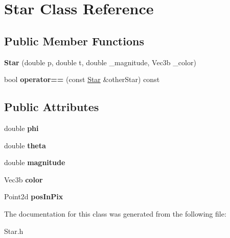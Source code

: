 \hypertarget{class_star}{}\section{Star Class Reference}
\label{class_star}
\subsection*{Public Member Functions}
\begin{DoxyCompactItemize}
\item 
\mbox{\label{class_star_a101f4cde043b8fab4622a885962c3ecd}} 
{\bfseries Star} (double p, double t, double \+\_\+magnitude, Vec3b \+\_\+color)
\item 
\mbox{\label{class_star_a05e2a5d973ef6e4812ecaf2980f11f17}} 
bool {\bfseries operator==} (const \mbox{\hyperlink{class_star}{Star}} \&other\+Star) const
\end{DoxyCompactItemize}
\subsection*{Public Attributes}
\begin{DoxyCompactItemize}
\item 
\mbox{\label{class_star_ada2e348ef36d847f667ac745d23deb38}} 
double {\bfseries phi}
\item 
\mbox{\label{class_star_a3872ef8a9325020a3f1cee1eec762493}} 
double {\bfseries theta}
\item 
\mbox{\label{class_star_a2496dd6541fffff40255753b5981427e}} 
double {\bfseries magnitude}
\item 
\mbox{\label{class_star_a3ddc95beb1561e21cb9776cef2ec9000}} 
Vec3b {\bfseries color}
\item 
\mbox{\label{class_star_a4dc7d8fff0cf2c154acf93fdca08e3ed}} 
Point2d {\bfseries pos\+In\+Pix}
\end{DoxyCompactItemize}


The documentation for this class was generated from the following file\+:\begin{DoxyCompactItemize}
\item 
Star.\+h\end{DoxyCompactItemize}
